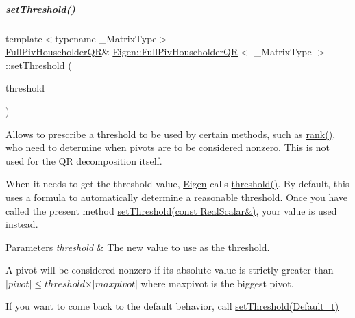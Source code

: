 \mbox{\label{group___q_r___module_a92277e572bf98245891015d12dd2b602}} 
\subparagraph{\texorpdfstring{set\+Threshold()}{setThreshold()}\hspace{0.1cm}{\footnotesize\ttfamily [1/4]}}
{\footnotesize\ttfamily template$<$typename \+\_\+\+Matrix\+Type$>$ \\
\hyperlink{group___q_r___module_class_eigen_1_1_full_piv_householder_q_r}{Full\+Piv\+Householder\+QR}\& \hyperlink{group___q_r___module_class_eigen_1_1_full_piv_householder_q_r}{Eigen\+::\+Full\+Piv\+Householder\+QR}$<$ \+\_\+\+Matrix\+Type $>$\+::set\+Threshold (\begin{DoxyParamCaption}\item[{const Real\+Scalar \&}]{threshold }\end{DoxyParamCaption})\hspace{0.3cm}{\ttfamily [inline]}}

Allows to prescribe a threshold to be used by certain methods, such as \hyperlink{group___q_r___module_aeae555220f46477818ccc94aca2de770}{rank()}, who need to determine when pivots are to be considered nonzero. This is not used for the QR decomposition itself.

When it needs to get the threshold value, \hyperlink{namespace_eigen}{Eigen} calls \hyperlink{group___q_r___module_af7f6ac15ca19c2b9e45dc3eaae58c201}{threshold()}. By default, this uses a formula to automatically determine a reasonable threshold. Once you have called the present method \hyperlink{group___q_r___module_a92277e572bf98245891015d12dd2b602}{set\+Threshold(const Real\+Scalar\&)}, your value is used instead.


\begin{DoxyParams}{Parameters}
{\em threshold} & The new value to use as the threshold.\\
\hline
\end{DoxyParams}
A pivot will be considered nonzero if its absolute value is strictly greater than $ \vert pivot \vert \leqslant threshold \times \vert maxpivot \vert $ where maxpivot is the biggest pivot.

If you want to come back to the default behavior, call \hyperlink{group___q_r___module_aaea4bf3dd145e0cddb16e364cca9d887}{set\+Threshold(\+Default\+\_\+t)} 

